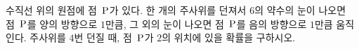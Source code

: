 수직선 위의 원점에 점~$\mathrm{P}$가 있다. 한 개의 주사위를 던져서 $6$의 약수의 눈이 나오면 점~$\mathrm{P}$를 양의 방향으로 $1$만큼, 그 외의 눈이 나오면 점~$\mathrm{P}$를 음의 방향으로 $1$만큼 움직인다. 주사위를 $4$번 던질 때, 점~$\mathrm{P}$가 $2$의 위치에 있을 확률을 구하시오.
